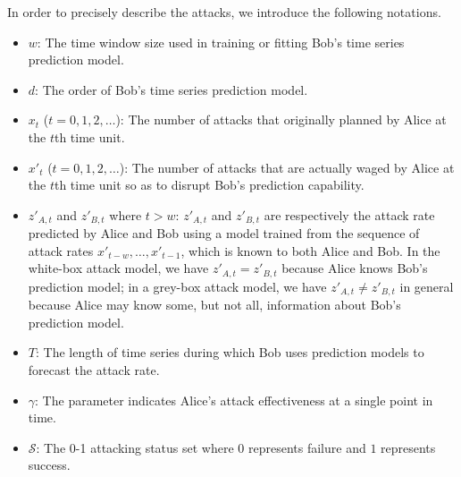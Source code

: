 \documentclass[journal]{IEEEtran}
\begin{document}
In order to precisely describe the attacks, we introduce the following notations.
\begin{itemize}
\item $w$: The time window size used in training or fitting Bob's time series prediction model.
\item $d$: The order of Bob's time series prediction model.
\item $x_t$ ($t=0,1,2,\ldots$): The number of attacks that originally planned by Alice at the $t$th time unit.
\item $x'_t$ ($t=0,1,2,\ldots$): The number of attacks that are actually waged by Alice at the $t$th time unit so as to disrupt Bob's prediction capability.
\item $z'_{A,t}$ and $z'_{B,t}$ where $t>w$: $z'_{A,t}$ and $z'_{B,t}$ are respectively the attack rate predicted by Alice and Bob using a model trained from the sequence of attack rates $x'_{t-w},\ldots,x'_{t-1}$, which is known to both Alice and Bob. In the white-box attack model, we have  $z'_{A,t}=z'_{B,t}$ because Alice knows Bob's prediction model; in a grey-box attack model, we have  $z'_{A,t}\neq z'_{B,t}$ in general because Alice may know some, but not all, information about Bob's prediction model.
\item $T$: The length of time series during which Bob uses prediction models to forecast the attack rate.
\item $\gamma$: The parameter indicates Alice's attack effectiveness at a single point in time.
\item $\mathcal{S}$: The 0-1 attacking status set where $0$ represents failure and $1$ represents success.


\end{itemize}
\end{document}
